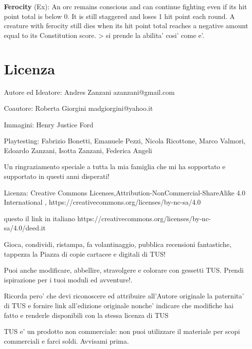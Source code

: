 \documentclass[a4paper,11pt,twoside,openany]{dndbook}
\begin{document}
\textbf{Ferocity} (Ex): An orc remains conscious and can continue fighting even if its hit point total is below 0. It is still staggered and loses 1 hit point each round. A creature with ferocity still dies when its hit point total reaches a negative amount equal to its Constitution score. \textgreater{} si prende la abilita' cosi' come e'.

\pagebreak

\twocolumn

\printindex{}

\onecolumn

\label{indice-analitico}

\pagebreak

\section{Licenza}

Autore ed Ideatore: Andres Zanzani azanzani@gmail.com

\bigskip
Coautore: Roberta Giorgini madgiorgini@yahoo.it

Immagini: Henry Justice Ford

\bigskip

Playtesting: Fabrizio Bonetti, Emanuele Pezzi, Nicola Ricottone, Marco Valmori, Edoardo Zanzani, Isotta Zanzani, Federica Angeli

\bigskip

Un ringraziamento speciale a tutta la mia famiglia che mi ha sopportato e supportato in questi anni disperati!

\bigskip

Licenza: Creative Commons Licenses,Attribution-NonCommercial-ShareAlike 4.0 International , https://creativecommons.org/licenses/by-nc-sa/4.0

questo il link in italiano https://creativecommons.org/licenses/by-nc-sa/4.0/deed.it

Gioca, condividi, ristampa, fa volantinaggio, pubblica recensioni fantastiche, tappezza la Piazza di copie cartacee e digitali di TUS!

Puoi anche modificare, abbellire, stravolgere e colorare con gessetti TUS. Prendi ispirazione per i tuoi moduli ed avventure!.

Ricorda pero' che devi riconoscere ed attribuire all'Autore originale la paternita' di TUS e fornire link all'edizione originale nonche' indicare che modifiche hai fatto e renderle disponibili con la stessa licenza di TUS

\bigskip
TUS e' un prodotto non commerciale: non puoi utilizzare il materiale per scopi commerciali e farci soldi. Avvisami prima.
\end{document}
